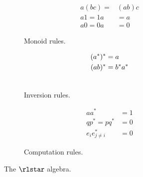 \begin{figure}
  \vspace{0.3em}
  \begin{subfigure}{0.28\textwidth}
    \caption{Monoid rules.}
    \label{fig:rlstar:monoid}
    \vspace{-1.5em}
    \begin{align}
    \label{eq:lstar:assoc}
      a(bc) =& (ab)c\\
    \label{eq:lstar:one}
      a1 = 1a &= a\\
    \label{eq:lstar:zero}
      a0 = 0a &= 0
    \end{align}
  \end{subfigure}
  \hfill
  \begin{subfigure}{0.23\textwidth}
    \caption{Inversion rules.}
    \label{fig:rlstar:conc-inv}
    \vspace{-1.5em}
    \begin{align}
    \label{eq:lstar:idemp}
      (a^*)^* &= a\\
    \label{eq:lstar:invol}
      (a b)^* &= b^* a^*\\
    \notag
    \end{align}
  \end{subfigure} 
  \hfill
  \begin{subfigure}{0.28\textwidth}
    \caption{Computation rules.}
    \label{fig:rlstar:neutr-ann}
    \vspace{-1.5em}
    \begin{align}
    \label{eq:lstar:neutr}
      a a^* &= 1\\
    \label{eq:lstar:annihil:impl}
      q p^* = p q^* &= 0\\
    \label{eq:rlstar:annihil:exp}
      e_i e_{j \neq i}^* &= 0
    \end{align}
  \end{subfigure}
  \caption{The $\rlstar$ algebra.}
\end{figure}

